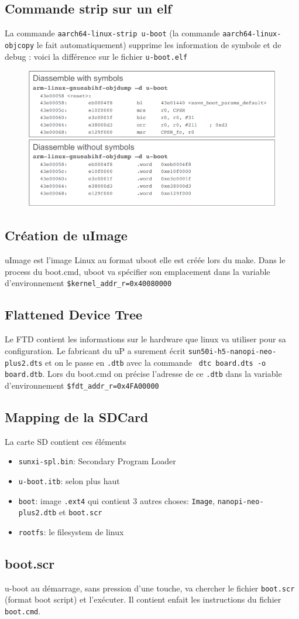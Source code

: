 \subsection{Commande strip sur un elf}
La commande \verb!aarch64-linux-strip u-boot! (la commande \verb!aarch64-linux-objcopy! le fait automatiquement) supprime les information de symbole et de debug : voici la différence sur le fichier \verb!u-boot.elf!
\begin{figure}[H]
\centering
\includegraphics[width=0.9\columnwidth]{Figures/uboot_01.png}
\end{figure}

\subsection{Création de uImage}
uImage est l'image Linux au format uboot elle est créée lors du make. Dans le process du boot.cmd, uboot va spécifier son emplacement dans la variable d'environnement \verb!$kernel_addr_r=0x40080000!

\subsection{Flattened Device Tree}
Le FTD contient les informations sur le hardware que linux va utiliser pour sa configuration. Le fabricant du uP a surement écrit \verb!sun50i-h5-nanopi-neo-plus2.dts! et on le passe en \verb!.dtb! avec la commande \verb! dtc board.dts -o board.dtb!. Lors du boot.cmd on précise l'adresse de ce \verb!.dtb! dans la variable d'environnement \verb!$fdt_addr_r=0x4FA00000!

\subsection{Mapping de la SDCard}
La carte SD contient ces éléments
\begin{itemize}
\item \verb!sunxi-spl.bin!: Secondary Program Loader
\item \verb!u-boot.itb!: selon plus haut
\item \verb!boot!: image \verb!.ext4! qui contient 3 autres choses: \verb!Image!, \verb!nanopi-neo-plus2.dtb! et \verb!boot.scr!
\item \verb!rootfs!: le filesystem de linux
\end{itemize}

\subsection{boot.scr}
u-boot au démarrage, sans pression d'une touche, va chercher le fichier \verb!boot.scr! (format boot script) et l'exécuter. Il contient enfait les instructions du fichier \verb!boot.cmd!.

